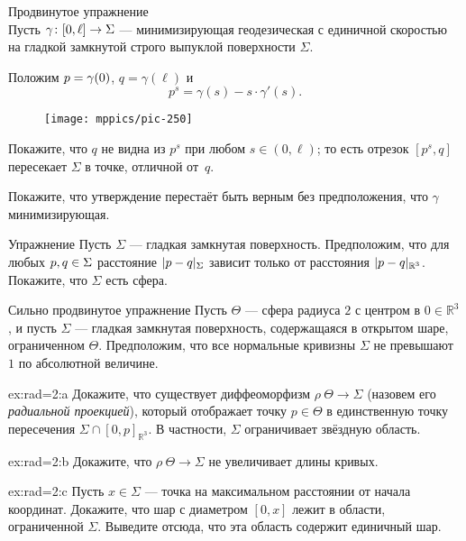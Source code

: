 {

\begin{thm}{Продвинутое упражнение}\label{ex:milka}\\
Пусть $\gamma\:[0,\ell]\z\to \Sigma$ --- минимизирующая геодезическая с единичной скоростью на 
гладкой замкнутой строго выпуклой поверхности $\Sigma$.

Положим $p\z=\gamma(0)$, $q=\gamma(\ell)$ и 
\[p^s=\gamma(s)-s\cdot\gamma'(s).\]

\begin{wrapfigure}{r}{40 mm}
\vskip-4mm
\centering
\texttt{[image: mppics/pic-250]}
\vskip-0mm
\end{wrapfigure}

Покажите, что $q$ не видна из $p^s$ при любом $s\in (0,\ell)$;
то есть отрезок $[p^s,q]$ пересекает $\Sigma$ в точке, отличной от~$q$.

Покажите, что утверждение перестаёт быть верным без предположения, что $\gamma$ минимизирующая.
\end{thm}

}

\begin{wrapfigure}[3]{r}{40 mm}
\end{wrapfigure}

\begin{thm}{Упражнение}\label{ex:round-sphere}
Пусть $\Sigma$ --- гладкая замкнутая поверхность.
Предположим, что для любых $p,q\z\in \Sigma$ расстояние $\dist{p}{q}\Sigma$ зависит только от расстояния $\dist{p}{q}{\mathbb{R}^3}$.
Покажите, что $\Sigma$ есть сфера.
\end{thm}

\begin{thm}{Сильно продвинутое упражнение}\label{ex:rad=2}
Пусть \(\Theta\) — сфера радиуса $2$ с центром в $0\in\mathbb{R}^3$,
и пусть \( \Sigma \) — гладкая замкнутая поверхность, содержащаяся в открытом шаре, ограниченном \(\Theta\).
Предположим, что все нормальные кривизны \( \Sigma \) не превышают~$1$ по абсолютной величине.

\begin{subthm}{ex:rad=2:a}
Докажите, что существует диффеоморфизм \(\rho\:\Theta \to \Sigma \) (назовем его \emph{радиальной проекцией}),
который отображает точку \( p \in \Theta \) в единственную точку пересечения \( \Sigma \cap [0,p]_{\mathbb{R}^3} \).
В частности, \( \Sigma \) ограничивает звёздную область.
\end{subthm}

\begin{subthm}{ex:rad=2:b}
Докажите, что \(\rho\: \Theta \to \Sigma \) не увеличивает длины кривых.
\end{subthm}

\begin{subthm}{ex:rad=2:c}
Пусть \( x\in \Sigma \) — точка на максимальном расстоянии от начала координат.
Докажите, что шар с диаметром \( [0, x] \) лежит в области, ограниченной \( \Sigma \).
Выведите отсюда, что эта область содержит единичный шар.
\end{subthm}

\end{thm}


